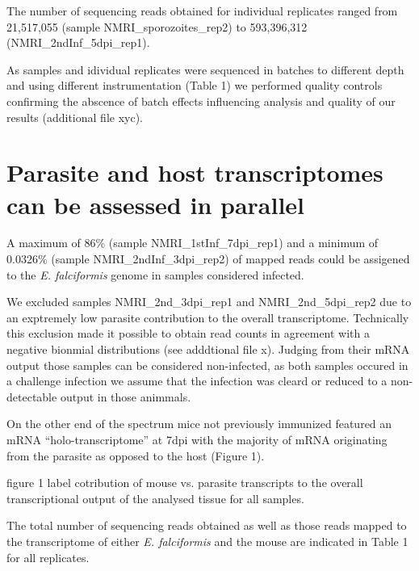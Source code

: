 \documentclass{bmcart}
\begin{document}
The number of sequencing reads obtained for individual replicates
ranged from 21,517,055 (sample NMRI\_sporozoites\_rep2) to 593,396,312
(NMRI\_2ndInf\_5dpi\_rep1).

As samples and idividual replicates were sequenced in batches to
different depth and using different instrumentation (Table 1) we
performed quality controls confirming the abscence of batch effects
influencing analysis and quality of our results (additional file xyc).

\section*{Parasite and host transcriptomes can be assessed in parallel}

A maximum of 86\% (sample NMRI\_1stInf\_7dpi\_rep1) and a minimum of
0.0326\% (sample NMRI\_2ndInf\_3dpi\_rep2) of mapped reads could be
assigened to the \textit{E. falciformis} genome in samples considered
infected.

We excluded samples NMRI\_2nd\_3dpi\_rep1 and NMRI\_2nd\_5dpi\_rep2
due to an exptremely low parasite contribution to the overall
transcriptome. Technically this exclusion made it possible to obtain
read counts in agreement with a negative bionmial distributions (see
adddtional file x). Judging from their mRNA output those samples can
be considered non-infected, as both samples occured in a challenge
infection we assume that the infection was cleard or reduced to a
non-detectable output in those animmals.

On the other end of the spectrum mice not previously immunized
featured an mRNA ``holo-transcriptome'' at 7dpi with the majority of
mRNA originating from the parasite as opposed to the host (Figure 1).

figure 1 label
cotribution of mouse vs. parasite transcripts to the overall
transcriptional output of the analysed tissue for all samples.

The total number of sequencing reads obtained as well as those reads
mapped to the transcriptome of either \textit{E. falciformis} and the
mouse are indicated in Table 1 for all replicates.



\end{document}
